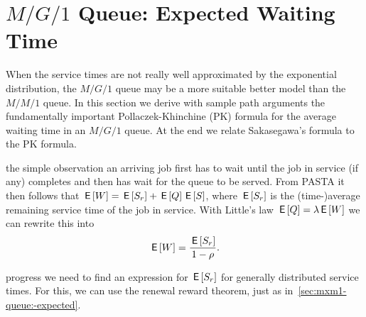 




\section{$M/G/1$ Queue: Expected Waiting Time}
\label{sec:mg1}


When the service times are not really well approximated by the exponential distribution, the $M/G/1$ queue may be a more suitable better model than the $M/M/1$ queue.
In this section we derive with sample path arguments the fundamentally important Pollaczek-Khinchine (PK) formula for the average waiting time in an $M/G/1$ queue.
At the end we relate Sakasegawa's formula to the PK formula.


 the simple observation an arriving job first has to wait until the job in service (if any) completes and then has wait for the queue to be served.
From PASTA it then follows  that
$\,\mathsf{E}\left[W\right] = \,\mathsf{E}\left[S_r\right] + \,\mathsf{E}\left[Q\right] \,\mathsf{E}\left[S\right]$, where  $\,\mathsf{E}\left[S_r\right]$ is the (time-)average remaining service time of the job in service. 
With Little's law $\,\mathsf{E}\left[Q\right] = \lambda \,\mathsf{E}\left[W\right]$ we can rewrite this into 
\begin{equation*}
 \,\mathsf{E}\left[W\right] = \frac{\,\mathsf{E}\left[S_r\right]}{1-\rho}.
\end{equation*}

 progress we need to find an expression for $\,\mathsf{E}\left[S_r\right]$ for generally distributed service times.
For this, we can use the renewal reward theorem, just as in~\cref{sec:mxm1-queue:-expected}.

